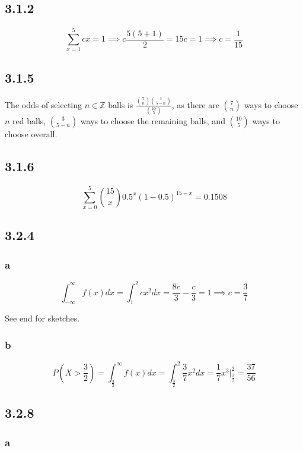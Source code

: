 \documentclass[12pt,letterpaper]{article}
\theoremstyle{definition}
\newcommand{\Z}{\mathbb{Z}}
\begin{document}
\subsection*{3.1.2}

\[
  \sum_{x=1}^5cx = 1 \implies c\frac{5(5+1)}{2} = 15c = 1 \implies c= \frac{1}{15}
\]

\subsection*{3.1.5}

The odds of selecting $n \in \Z$ balls is $\frac{\binom{7}{n}\binom{3}{5 -
    n}}{\binom{10}{5}}$, as there are $\binom{7}{n}$ ways to choose $n$ red
balls, $\binom{3}{5-n}$ ways to choose the remaining balls, and $\binom{10}{5}$
ways to choose overall.

\subsection*{3.1.6}

\[
  \sum_{x=0}^5\binom{15}{x}0.5^x(1-0.5)^{15-x} = 0.1508
\]

\subsection*{3.2.4}

\subsubsection*{a}

\[
  \int_{-\infty}^\infty f(x)dx = \int_1^2cx^2dx = \frac{8c}{3} - \frac{c}{3} = 1 \implies c = \frac{3}{7}
\]

See end for sketches.

\subsubsection*{b}

\[
  P(X > \frac{3}{2}) = \int_{\frac{3}{2}}^\infty f(x)dx =
  \int_{\frac{3}{2}}^2\frac{3}{7}x^2dx = \frac{1}{7}x^3\Big|^2_{\frac{3}{2}} = \frac{37}{56}
\]

\subsection*{3.2.8}

\subsubsection*{a}
\end{document}
